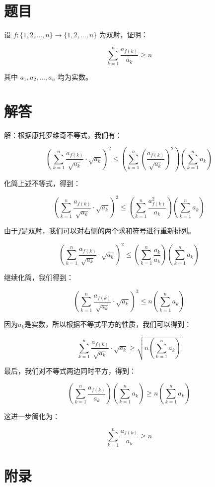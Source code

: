\documentclass[UTF8]{ctexart}
\begin{document}
\section{题目}
设 $f:\{1,2,\dots,n\} \rightarrow \{1,2,\dots,n\}$ 为双射，证明：

\[
\sum_{k=1}^{n} \frac{a_{f(k)}}{a_k} \geq n
\]

其中 $a_1, a_2, \dots, a_n$ 均为实数。

\section{解答}
解：根据康托罗维奇不等式，我们有：

\[
\left( \sum_{k=1}^{n} \frac{a_{f(k)}}{\sqrt{a_k}} \cdot \sqrt{a_k} \right)^2 \leq \left( \sum_{k=1}^{n} \left( \frac{a_{f(k)}}{\sqrt{a_k}} \right)^2 \right) \left( \sum_{k=1}^{n} a_k \right)
\]

化简上述不等式，得到：

\[
\left( \sum_{k=1}^{n} \frac{a_{f(k)}}{\sqrt{a_k}} \cdot \sqrt{a_k} \right)^2 \leq \left( \sum_{k=1}^{n} \frac{a_{f(k)}^2}{a_k} \right) \left( \sum_{k=1}^{n} a_k \right)
\]

由于$f$是双射，我们可以对右侧的两个求和符号进行重新排列。

\[
\left( \sum_{k=1}^{n} \frac{a_{f(k)}}{\sqrt{a_k}} \cdot \sqrt{a_k} \right)^2 \leq \left( \sum_{k=1}^{n} \frac{a_{k}}{a_k} \right) \left( \sum_{k=1}^{n} a_k \right)
\]

继续化简，我们得到：

\[
\left( \sum_{k=1}^{n} \frac{a_{f(k)}}{\sqrt{a_k}} \cdot \sqrt{a_k} \right)^2 \leq n \left( \sum_{k=1}^{n} a_k \right)
\]

因为$a_k$是实数，所以根据不等式平方的性质，我们可以得到：

\[
\sum_{k=1}^{n} \frac{a_{f(k)}}{\sqrt{a_k}} \cdot \sqrt{a_k} \geq \sqrt{n \left( \sum_{k=1}^{n} a_k \right)}
\]

最后，我们对不等式两边同时平方，得到：

\[
\left( \sum_{k=1}^{n} \frac{a_{f(k)}}{a_k} \right) \left( \sum_{k=1}^{n} a_k \right) \geq n \left( \sum_{k=1}^{n} a_k \right)
\]

这进一步简化为：

\[
\sum_{k=1}^{n} \frac{a_{f(k)}}{a_k} \geq n
\]

\section*{附录}
\end{document}
